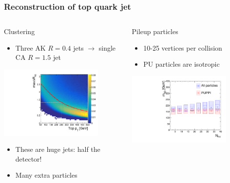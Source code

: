 \documentclass[aspectratio=169,xcolor=dvipsnames,,table,compress]{beamer}
\begin{document}
\begin{frame}[t]   \frametitle{Reconstruction of top quark jet}
  \vspace{-5mm}
  \begin{columns}[T]
  \begin{column}{0.33\textwidth}
  \centering 
    Clustering 
    \begin{itemize}
      \item {\small Three AK $R=0.4$ jets $\rightarrow$ single CA $R=1.5$ jet}
    \end{itemize}
      \includegraphics[width=0.8\textwidth]{../figures/toptagging/gen/ptdr.pdf}
      \vspace{-3mm}
    \begin{itemize}
      \item {\small These are huge jets: half the detector!}
      \item {\small Many extra particles}
    \end{itemize}
  \end{column}
  \pause 
  \begin{column}{0.33\textwidth}
  \centering 
    Pileup particles 
  \begin{itemize}
    \item {\small 10-25 vertices per collision}
    \item {\small PU particles are isotropic }
  \end{itemize}
      \includegraphics[width=0.8\textwidth]{../figures/toptagging/gen/npv_clf_MSD_ZpTT_lo.pdf}

\end{column}
\end{columns}
\end{frame}
\end{document}
